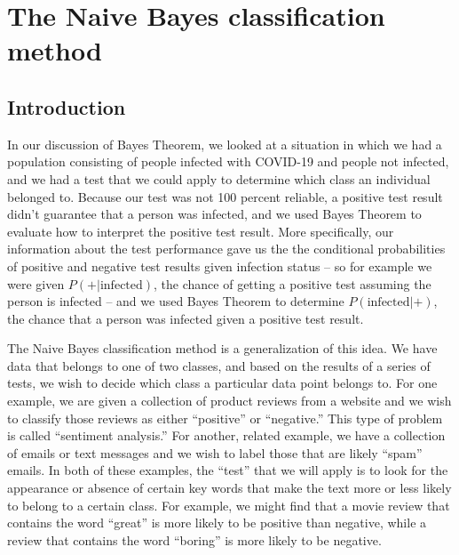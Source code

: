 \documentclass[
]{article}
\author{}
\date{}
\begin{document}

\hypertarget{the-naive-bayes-classification-method}{%
\section{The Naive Bayes classification
method}\label{the-naive-bayes-classification-method}}

\hypertarget{introduction}{%
\subsection{Introduction}\label{introduction}}

In our discussion of Bayes Theorem, we looked at a situation in which we
had a population consisting of people infected with COVID-19 and people
not infected, and we had a test that we could apply to determine which
class an individual belonged to. Because our test was not 100 percent
reliable, a positive test result didn't guarantee that a person was
infected, and we used Bayes Theorem to evaluate how to interpret the
positive test result. More specifically, our information about the test
performance gave us the the conditional probabilities of positive and
negative test results given infection status -- so for example we were
given \(P(+|\mathrm{infected})\), the chance of getting a positive test
assuming the person is infected -- and we used Bayes Theorem to
determine \(P(\mathrm{infected}|+)\), the chance that a person was
infected given a positive test result.

The Naive Bayes classification method is a generalization of this idea.
We have data that belongs to one of two classes, and based on the
results of a series of tests, we wish to decide which class a particular
data point belongs to. For one example, we are given a collection of
product reviews from a website and we wish to classify those reviews as
either ``positive'' or ``negative.'' This type of problem is called
``sentiment analysis.'' For another, related example, we have a
collection of emails or text messages and we wish to label those that
are likely ``spam'' emails. In both of these examples, the ``test'' that
we will apply is to look for the appearance or absence of certain key
words that make the text more or less likely to belong to a certain
class. For example, we might find that a movie review that contains the
word ``great'' is more likely to be positive than negative, while a
review that contains the word ``boring'' is more likely to be negative.
\end{document}
